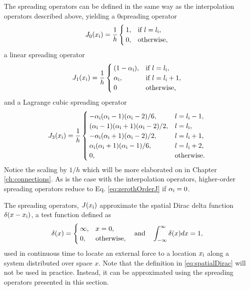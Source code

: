 The spreading operators can be defined in the same way as the interpolation operators described above, yielding a $0$\thOrder spreading operator
\begin{equation}\label{eq:zerothOrderJ}
    J_0(x_{\text{i}}) = \frac{1}{h}\begin{cases}
        1, & \text{if}\ l = l_{\text{i}},\\
        0, & \text{otherwise},
    \end{cases}
\end{equation}
a linear spreading operator
\begin{equation}\label{eq:firstOrderJ}
    J_1(x_{\text{i}}) = \frac{1}{h}\begin{cases}
        (1-\alpha_{\text{i}}), & \text{if}\ l = l_{\text{i}},\\
        \alpha_{\text{i}} , & \text{if}\ l = l_{\text{i}} + 1,\\
        0 & \text{otherwise,}
    \end{cases}
\end{equation}
and a Lagrange cubic spreading operator
\begin{equation}\label{eq:cubicJ}
    J_3(x_{\text{i}}) = \frac{1}{h}\begin{cases}
        -\alpha_{\text{i}} (\alpha_{\text{i}}-1)(\alpha_{\text{i}}-2)/6, & l = l_{\text{i}}-1,\\
        (\alpha_{\text{i}}-1)(\alpha_{\text{i}}+1)(\alpha_{\text{i}}-2)/2,  & l = l_{\text{i}},\\
        -\alpha_{\text{i}} (\alpha_{\text{i}}+1)(\alpha_{\text{i}}-2)/2, & l = l_{\text{i}} + 1,\\
        \alpha_{\text{i}} (\alpha_{\text{i}}+1)(\alpha_{\text{i}}-1)/6, & l = l_{\text{i}} + 2,\\
        0, & \text{otherwise.}
    \end{cases}
\end{equation}
Notice the scaling by $1/h$ which will be more elaborated on in Chapter \ref{ch:connections}. As is the case with the interpolation operators, higher-order spreading operators reduce to Eq. \eqref{eq:zerothOrderJ} if $\alpha_{\text{i}} = 0$.

The spreading operators, $J(x_{\text{i}})$ approximate the spatial Dirac delta function $\delta(x-x_{\text{i}})$, a test function defined as
\begin{equation}\label{eq:spatialDirac}
    \delta(x)= \begin{cases}
        \infty, & x = 0,\\
        0, & \text{otherwise},
    \end{cases} \quad \text{and} \quad \int_{-\infty}^{\infty} \delta(x)dx = 1,
\end{equation}
used in continuous time to locate an external force to a location $x_{\text{i}}$ along a system distributed over space $x$. Note that the definition in \eqref{eq:spatialDirac} will not be used in practice. Instead, it can be approximated using the spreading operators presented in this section. 

